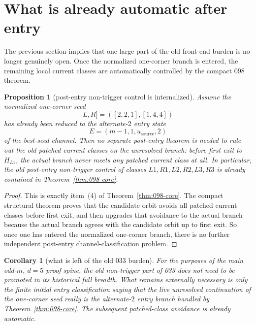 \documentclass[11pt]{article}
\newtheorem{proposition}[theorem]{Proposition}
\newtheorem{corollary}[theorem]{Corollary}
\begin{document}
\section{What is already automatic after entry}

The previous section implies that one large part of the old front-end burden is
no longer genuinely open.
Once the normalized one-corner branch is entered, the remaining local current
classes are automatically controlled by the compact \textup{098} theorem.

\begin{proposition}[post-entry non-trigger control is internalized]
\label{prop:post-entry-internalized}
Assume the normalized one-corner seed
\[
L,R]=([2,2,1],[1,4,4])
\]
has already been reduced to the alternate-$2$ entry state
\[
E=(m-1,1,u_{\mathrm{source}},2)
\]
of the best-seed channel.
Then no separate post-entry theorem is needed to rule out the old patched
current classes on the unresolved branch: before first exit to $H_{L1}$, the
actual branch never meets any patched current class at all.
In particular, the old post-entry non-trigger control of classes
\(L1,R1,L2,R2,L3,R3\) is already contained in
Theorem~\ref{thm:098-core}.
\end{proposition}

\begin{proof}
This is exactly item~(4) of Theorem~\ref{thm:098-core}.
The compact structural theorem proves that the candidate orbit avoids all patched
current classes before first exit, and then upgrades that avoidance to the
actual branch because the actual branch agrees with the candidate orbit up to
first exit.
So once one has entered the normalized one-corner branch, there is no further
independent post-entry channel-classification problem.
\end{proof}

\begin{corollary}[what is left of the old \textup{033} burden]
\label{cor:033-shrunk}
For the purposes of the main odd-$m$, $d=5$ proof spine, the old
non-trigger part of \textup{033} does \emph{not} need to be promoted in its
historical full breadth.
What remains externally necessary is only the finite \emph{initial entry}
classification saying that the live unresolved continuation of the one-corner
seed really is the alternate-$2$ entry branch handled by
Theorem~\ref{thm:098-core}.
The subsequent patched-class avoidance is already automatic.
\end{corollary}
\end{document}
